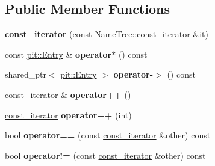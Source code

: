 \subsection*{Public Member Functions}
\begin{DoxyCompactItemize}
\item 
{\bfseries const\+\_\+iterator} (const \hyperlink{classnfd_1_1NameTree_1_1const__iterator}{Name\+Tree\+::const\+\_\+iterator} \&it)\hypertarget{classnfd_1_1Pit_1_1const__iterator_acd6352797af4b26ad41760ae0021a1f4}{}\label{classnfd_1_1Pit_1_1const__iterator_acd6352797af4b26ad41760ae0021a1f4}

\item 
const \hyperlink{classnfd_1_1pit_1_1Entry}{pit\+::\+Entry} \& {\bfseries operator$\ast$} () const\hypertarget{classnfd_1_1Pit_1_1const__iterator_a59724dce1a026ee7a57b6d2c2bd4cd5f}{}\label{classnfd_1_1Pit_1_1const__iterator_a59724dce1a026ee7a57b6d2c2bd4cd5f}

\item 
shared\+\_\+ptr$<$ \hyperlink{classnfd_1_1pit_1_1Entry}{pit\+::\+Entry} $>$ {\bfseries operator-\/$>$} () const\hypertarget{classnfd_1_1Pit_1_1const__iterator_a1a1915ea41cf7a4723427f20cfda979a}{}\label{classnfd_1_1Pit_1_1const__iterator_a1a1915ea41cf7a4723427f20cfda979a}

\item 
\hyperlink{classnfd_1_1Pit_1_1const__iterator}{const\+\_\+iterator} \& {\bfseries operator++} ()\hypertarget{classnfd_1_1Pit_1_1const__iterator_aa15b003d82b94a065c19d3cf16a75f9d}{}\label{classnfd_1_1Pit_1_1const__iterator_aa15b003d82b94a065c19d3cf16a75f9d}

\item 
\hyperlink{classnfd_1_1Pit_1_1const__iterator}{const\+\_\+iterator} {\bfseries operator++} (int)\hypertarget{classnfd_1_1Pit_1_1const__iterator_a33073d186d7722a617833e0490fe6959}{}\label{classnfd_1_1Pit_1_1const__iterator_a33073d186d7722a617833e0490fe6959}

\item 
bool {\bfseries operator==} (const \hyperlink{classnfd_1_1Pit_1_1const__iterator}{const\+\_\+iterator} \&other) const\hypertarget{classnfd_1_1Pit_1_1const__iterator_a889ff095d27217afc8e06c07fc3c4c7c}{}\label{classnfd_1_1Pit_1_1const__iterator_a889ff095d27217afc8e06c07fc3c4c7c}

\item 
bool {\bfseries operator!=} (const \hyperlink{classnfd_1_1Pit_1_1const__iterator}{const\+\_\+iterator} \&other) const\hypertarget{classnfd_1_1Pit_1_1const__iterator_ac7e294bb61bdb279034a74b242abeebb}{}\label{classnfd_1_1Pit_1_1const__iterator_ac7e294bb61bdb279034a74b242abeebb}

\end{DoxyCompactItemize}


